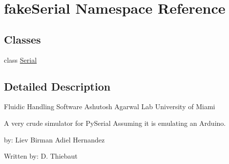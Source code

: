 \hypertarget{namespacefake_serial}{}\section{fake\+Serial Namespace Reference}
\label{namespacefake_serial}
\subsection*{Classes}
\begin{DoxyCompactItemize}
\item 
class \mbox{\hyperlink{classfake_serial_1_1_serial}{Serial}}
\end{DoxyCompactItemize}


\subsection{Detailed Description}
\begin{DoxyVerb}Fluidic Handling Software
Ashutosh Agarwal Lab
University of Miami

A very crude simulator for PySerial Assuming it is emulating an Arduino.

by:
Liev Birman
Adiel Hernandez

Written by:
D. Thiebaut
\end{DoxyVerb}
 